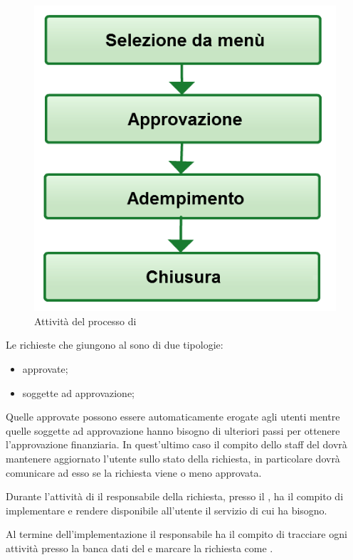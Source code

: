 \begin{figure}[htbp]
\centering
\includegraphics[scale=0.5]{Images/Diagrams/Request_fulfillment.png}
\caption{Attività del processo di }
\label{prc-request-activities-img}
\end{figure}

Le richieste che giungono al  sono di due tipologie:

\begin{itemize}
\item{approvate;}
\item{soggette ad approvazione;}
\end{itemize}

Quelle approvate possono essere automaticamente erogate agli utenti mentre quelle soggette ad approvazione hanno bisogno di ulteriori passi per ottenere l'approvazione finanziaria. In quest'ultimo caso il compito dello staff del  dovrà mantenere aggiornato l'utente sullo stato della richiesta, in particolare dovrà comunicare ad esso se la richiesta viene o meno approvata.

Durante l'attività di  il responsabile della richiesta, presso il , ha il compito di implementare e rendere disponibile all'utente il servizio di cui ha bisogno.

Al termine dell'implementazione il responsabile ha il compito di tracciare ogni attività presso la banca dati del  e marcare la richiesta come .